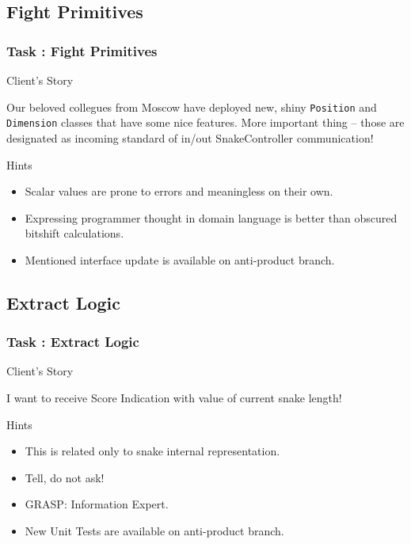 \documentclass[english]{beamer}
\newenvironment{narrowblock}[1]{%
\begin{center}
\begin{minipage}{10.5cm}
\begin{block}{#1}
}{%
\end{block}
\end{minipage}
\end{center}
}
\begin{document}
\subsection{Fight Primitives}

\begin{frame}
\frametitle{Task \thesubsection: Fight Primitives}

\begin{narrowblock}{Client's Story}
Our beloved collegues from Moscow have deployed new, shiny \texttt{Position} and \texttt{Dimension} classes that have some nice features. More important thing -- those are designated as incoming standard of in/out SnakeController communication!
\end{narrowblock}

\pause
\begin{narrowblock}{Hints}
\begin{itemize}[<+->]
\item Scalar values are prone to errors and meaningless on their own. 
\item Expressing programmer thought in domain language is better than obscured bitshift calculations.
\item Mentioned interface update is available on anti-product branch.
\end{itemize}
\end{narrowblock}
\end{frame}

\subsection{Extract Logic}

\begin{frame}
\frametitle{Task \thesubsection: Extract Logic}

\begin{narrowblock}{Client's Story}
I want to receive Score Indication with value of current snake length!
\end{narrowblock}

\pause
\begin{narrowblock}{Hints}
\begin{itemize}[<+->]
\item This is related only to snake internal representation.
\item Tell, do not ask!
\item GRASP: Information Expert.
\item New Unit Tests are available on anti-product branch.
\end{itemize}
\end{narrowblock}
\end{frame}
\end{document}
